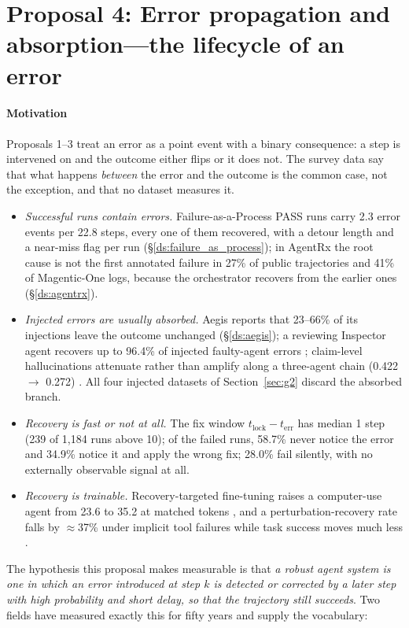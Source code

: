 \section{Proposal 4: Error propagation and absorption---the lifecycle of an error}\label{sec:future:lifecycle}

\paragraph{Motivation} Proposals 1--3 treat an error as a point event with a binary consequence: a step is intervened on and the outcome either flips or it does not. The survey data say that what happens \emph{between} the error and the outcome is the common case, not the exception, and that no dataset measures it.
\begin{itemize}[leftmargin=1.1em]
\item \emph{Successful runs contain errors.} Failure-as-a-Process PASS runs carry 2.3 error events per 22.8 steps, every one of them recovered, with a detour length and a near-miss flag per run (\S\ref{ds:failure_as_process}); in AgentRx the root cause is not the first annotated failure in 27\% of public trajectories and 41\% of Magentic-One logs, because the orchestrator recovers from the earlier ones (\S\ref{ds:agentrx}).
\item \emph{Injected errors are usually absorbed.} Aegis reports that 23--66\% of its injections leave the outcome unchanged (\S\ref{ds:aegis}); a reviewing Inspector agent recovers up to 96.4\% of injected faulty-agent errors \cite{huang2024resilience}; claim-level hallucinations attenuate rather than amplify along a three-agent chain (0.422 $\to$ 0.272) \cite{jamshidi2026cascade}. All four injected datasets of Section~\ref{sec:g2} discard the absorbed branch.
\item \emph{Recovery is fast or not at all.} The fix window $t_{\mathrm{lock}}-t_{\mathrm{err}}$ has median 1 step (239 of 1,184 runs above 10); of the failed runs, 58.7\% never notice the error and 34.9\% notice it and apply the wrong fix; 28.0\% fail silently, with no externally observable signal at all.
\item \emph{Recovery is trainable.} Recovery-targeted fine-tuning raises a computer-use agent from 23.6 to 35.2 at matched tokens \cite{cuarecovery2026}, and a perturbation-recovery rate falls by $\approx$37\% under implicit tool failures while task success moves much less \cite{zhu2026toolmaze}.
\end{itemize}
The hypothesis this proposal makes measurable is that \emph{a robust agent system is one in which an error introduced at step $k$ is detected or corrected by a later step with high probability and short delay, so that the trajectory still succeeds}. Two fields have measured exactly this for fifty years and supply the vocabulary:
